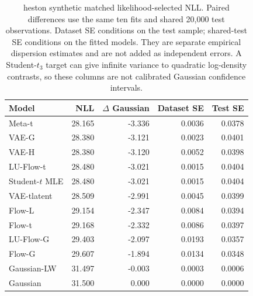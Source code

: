 \documentclass[11pt]{article}
\theoremstyle{definition}\newtheorem{definition}[theorem]{Definition}
\theoremstyle{remark}\newtheorem{remark}[theorem]{Remark}
\begin{document}
\begin{table}[htbp]
\centering\footnotesize
\setlength{\tabcolsep}{4pt}
\begin{tabular}{lrrrr}
\toprule
Model & NLL & $\Delta$ Gaussian & Dataset SE & Test SE \\
\midrule
Meta-t & 28.165 & -3.336 & 0.0036 & 0.0378 \\
VAE-G & 28.380 & -3.121 & 0.0023 & 0.0401 \\
VAE-H & 28.380 & -3.120 & 0.0052 & 0.0398 \\
LU-Flow-t & 28.480 & -3.021 & 0.0015 & 0.0404 \\
Student-$t$ MLE & 28.480 & -3.021 & 0.0015 & 0.0404 \\
VAE-tlatent & 28.509 & -2.991 & 0.0045 & 0.0399 \\
Flow-L & 29.154 & -2.347 & 0.0084 & 0.0394 \\
Flow-t & 29.168 & -2.332 & 0.0086 & 0.0397 \\
LU-Flow-G & 29.403 & -2.097 & 0.0193 & 0.0357 \\
Flow-G & 29.607 & -1.894 & 0.0134 & 0.0348 \\
Gaussian-LW & 31.497 & -0.003 & 0.0003 & 0.0006 \\
Gaussian & 31.500 & 0.000 & 0.0000 & 0.0000 \\
\bottomrule
\end{tabular}
\caption{heston synthetic matched likelihood-selected NLL. Paired differences use the same ten fits and shared 20,000 test observations. Dataset SE conditions on the test sample; shared-test SE conditions on the fitted models. They are separate empirical dispersion estimates and are not added as independent errors. A Student-$t_3$ target can give infinite variance to quadratic log-density contrasts, so these columns are not calibrated Gaussian confidence intervals.}\label{tab:r4-density-heston}
\end{table}

\FloatBarrier
\end{document}
